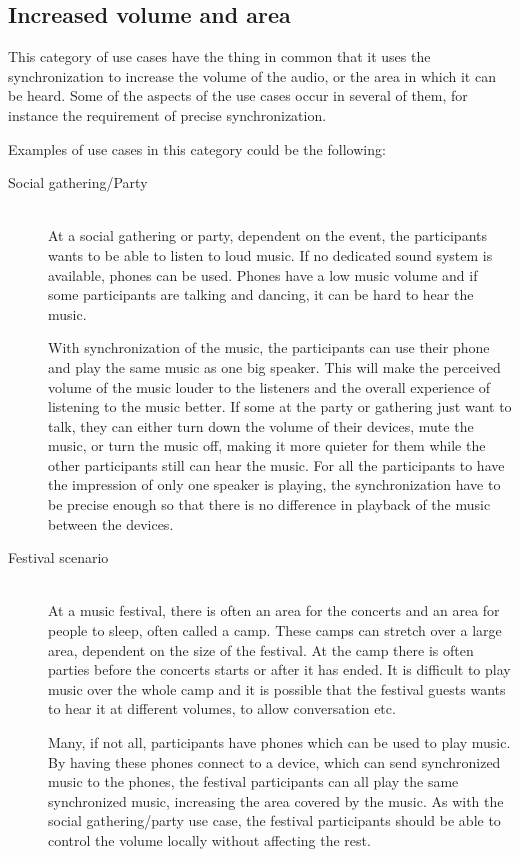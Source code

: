 \subsection{Increased volume and area}
This category of use cases have the thing in common that it uses the synchronization to increase the volume of the audio, or the area in which it can be heard.
Some of the aspects of the use cases occur in several of them, for instance the requirement of precise synchronization.

Examples of use cases in this category could be the following:

\begin{description}
    \item[Social gathering/Party] \hfill\\
        At a social gathering or party, dependent on the event, the participants wants to be able to listen to loud music.
        If no dedicated sound system is available, phones can be used. 
        Phones have a low music volume and if some participants are talking and dancing, it can be hard to hear the music.

        With synchronization of the music, the participants can use their phone and play the same music as one big speaker.
        This will make the perceived volume of the music louder to the listeners and the overall experience of listening to the music better.
        If some at the party or gathering just want to talk, they can either turn down the volume of their devices, mute the music, or turn the music off,
        making it more quieter for them while the other participants still can hear the music.
        For all the participants to have the impression of only one speaker is playing, 
        the synchronization have to be precise enough so that there is no difference in playback of the music between the devices.

    \item[Festival scenario] \hfill\\
        At a music festival, there is often an area for the concerts and an area for people to sleep, often called a camp.
        These camps can stretch over a large area, dependent on the size of the festival.
        At the camp there is often parties before the concerts starts or after it has ended.
        It is difficult to play music over the whole camp and it is possible that the festival guests wants to hear it at different volumes, to allow conversation etc.

        Many, if not all, participants have phones which can be used to play music.
        By having these phones connect to a device, which can send synchronized music to the phones,
        the festival participants can all play the same synchronized music,
        increasing the area covered by the music.
        As with the social gathering/party use case,
        the festival participants should be able to control the volume locally without affecting the rest.


\end{description}

